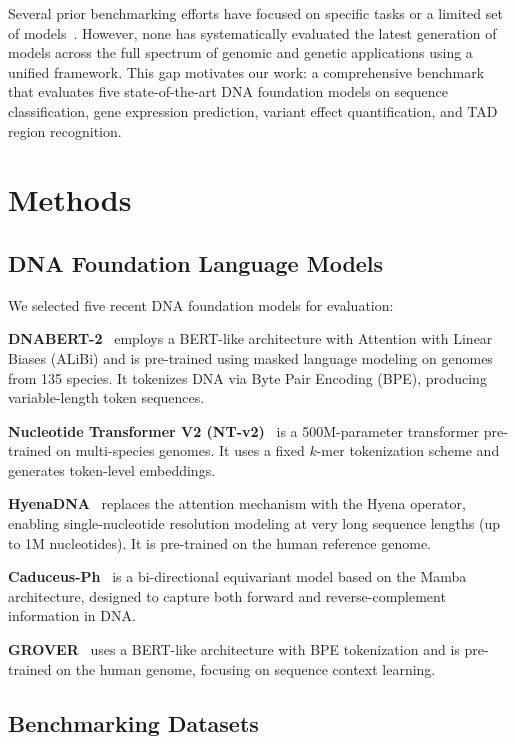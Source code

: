 \documentclass[11pt]{article}
\begin{document}
Several prior benchmarking efforts have focused on specific tasks or a limited set of models~\citep{gresova2023genomic,marin2024bend}. However, none has systematically evaluated the latest generation of models across the full spectrum of genomic and genetic applications using a unified framework. This gap motivates our work: a comprehensive benchmark that evaluates five state-of-the-art DNA foundation models on sequence classification, gene expression prediction, variant effect quantification, and TAD region recognition.

\section{Methods}

\subsection{DNA Foundation Language Models}

We selected five recent DNA foundation models for evaluation:

\textbf{DNABERT-2}~\citep{zhou2024dnabert2} employs a BERT-like architecture with Attention with Linear Biases (ALiBi) and is pre-trained using masked language modeling on genomes from 135 species. It tokenizes DNA via Byte Pair Encoding (BPE), producing variable-length token sequences.

\textbf{Nucleotide Transformer V2 (NT-v2)}~\citep{dallatorre2025nucleotide} is a 500M-parameter transformer pre-trained on multi-species genomes. It uses a fixed $k$-mer tokenization scheme and generates token-level embeddings.

\textbf{HyenaDNA}~\citep{nguyen2023hyenadna} replaces the attention mechanism with the Hyena operator, enabling single-nucleotide resolution modeling at very long sequence lengths (up to 1M nucleotides). It is pre-trained on the human reference genome.

\textbf{Caduceus-Ph}~\citep{schiff2024caduceus} is a bi-directional equivariant model based on the Mamba architecture, designed to capture both forward and reverse-complement information in DNA.

\textbf{GROVER}~\citep{sanabria2024grover} uses a BERT-like architecture with BPE tokenization and is pre-trained on the human genome, focusing on sequence context learning.

\subsection{Benchmarking Datasets}
\end{document}
